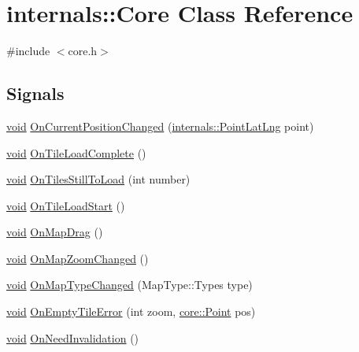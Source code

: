 \hypertarget{classinternals_1_1_core}{\section{internals\-:\-:\-Core \-Class \-Reference}
\label{classinternals_1_1_core}
}


{\ttfamily \#include $<$core.\-h$>$}

\subsection*{\-Signals}
\begin{DoxyCompactItemize}
\item 
\hyperlink{group___u_a_v_objects_plugin_ga444cf2ff3f0ecbe028adce838d373f5c}{void} \hyperlink{group___o_p_map_widget_ga2491a90fa3143792bc6f14153750d5d2}{\-On\-Current\-Position\-Changed} (\hyperlink{structinternals_1_1_point_lat_lng}{internals\-::\-Point\-Lat\-Lng} point)
\item 
\hyperlink{group___u_a_v_objects_plugin_ga444cf2ff3f0ecbe028adce838d373f5c}{void} \hyperlink{group___o_p_map_widget_gac03cc68ae31948f87512df9b4b25a104}{\-On\-Tile\-Load\-Complete} ()
\item 
\hyperlink{group___u_a_v_objects_plugin_ga444cf2ff3f0ecbe028adce838d373f5c}{void} \hyperlink{group___o_p_map_widget_ga8fbc5fa54e3d35c3008d0117c998638e}{\-On\-Tiles\-Still\-To\-Load} (int number)
\item 
\hyperlink{group___u_a_v_objects_plugin_ga444cf2ff3f0ecbe028adce838d373f5c}{void} \hyperlink{group___o_p_map_widget_gae5debcd025be8ef286b44c846bcf307d}{\-On\-Tile\-Load\-Start} ()
\item 
\hyperlink{group___u_a_v_objects_plugin_ga444cf2ff3f0ecbe028adce838d373f5c}{void} \hyperlink{group___o_p_map_widget_ga86c23f03f213d9cdd416259faa5e1835}{\-On\-Map\-Drag} ()
\item 
\hyperlink{group___u_a_v_objects_plugin_ga444cf2ff3f0ecbe028adce838d373f5c}{void} \hyperlink{group___o_p_map_widget_ga79ea52272693c681261bee7f02cdd9a4}{\-On\-Map\-Zoom\-Changed} ()
\item 
\hyperlink{group___u_a_v_objects_plugin_ga444cf2ff3f0ecbe028adce838d373f5c}{void} \hyperlink{group___o_p_map_widget_ga9be685397ee72f5e1ecc2694b61d0819}{\-On\-Map\-Type\-Changed} (\-Map\-Type\-::\-Types type)
\item 
\hyperlink{group___u_a_v_objects_plugin_ga444cf2ff3f0ecbe028adce838d373f5c}{void} \hyperlink{group___o_p_map_widget_ga0b750ffa3c184237b9625bdb9fa8c2c8}{\-On\-Empty\-Tile\-Error} (int zoom, \hyperlink{structcore_1_1_point}{core\-::\-Point} pos)
\item 
\hyperlink{group___u_a_v_objects_plugin_ga444cf2ff3f0ecbe028adce838d373f5c}{void} \hyperlink{group___o_p_map_widget_gaa550210d61bf033b3dd3d73fbfd7d8f9}{\-On\-Need\-Invalidation} ()
\end{DoxyCompactItemize}
